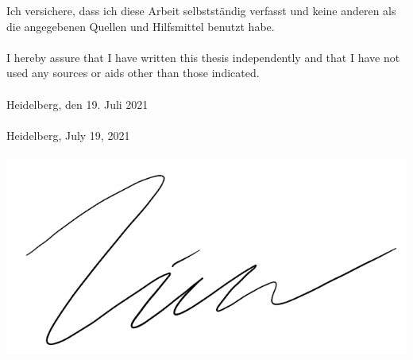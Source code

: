 Ich versichere, dass ich diese Arbeit selbstst\"{a}ndig verfasst und keine anderen als die angegebenen Quellen und Hilfsmittel benutzt habe.
\\\\
\noindent I hereby assure that I have written this thesis independently and that I have not used any sources or aids other than those indicated.
\\\\
\noindent Heidelberg, den 19. Juli 2021
\\\\
\noindent Heidelberg, July 19, 2021
\\\\
\includegraphics[width=.5\textwidth]{Chapters/figures/unterschrift.PNG}
